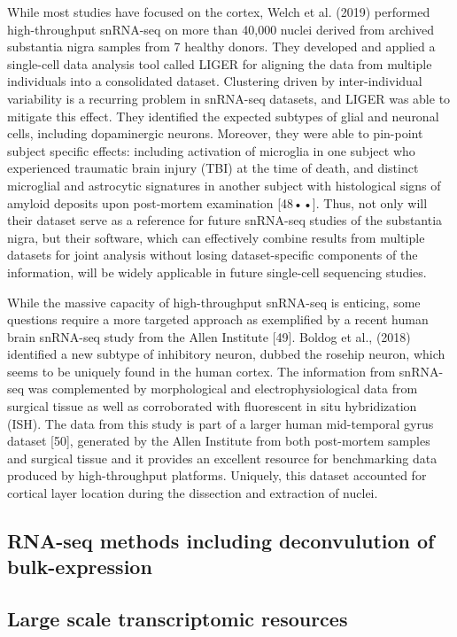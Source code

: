 \documentclass[12pt]{article}
\begin{document}
While most studies have focused on the cortex, Welch et al. (2019) performed high-throughput snRNA-seq on more than 40,000 nuclei derived from archived substantia nigra samples from 7 healthy donors. They developed and applied a single-cell data analysis tool called LIGER for aligning the data from multiple individuals into a consolidated dataset. Clustering driven by inter-individual variability is a recurring problem in snRNA-seq datasets, and LIGER was able to mitigate this effect. They identified the expected subtypes of glial and neuronal cells, including dopaminergic neurons. Moreover, they were able to pin-point subject specific effects: including activation of microglia in one subject who experienced traumatic brain injury (TBI) at the time of death, and distinct microglial and astrocytic signatures in another subject with histological signs of amyloid deposits upon post-mortem examination [48••]. Thus, not only will their dataset serve as a reference for future snRNA-seq studies of the substantia nigra, but their software, which can effectively combine results from multiple datasets for joint analysis without losing dataset-specific components of the information, will be widely applicable in future single-cell sequencing studies.

While the massive capacity of high-throughput snRNA-seq is enticing, some questions require a more targeted approach as exemplified by a recent human brain snRNA-seq study from the Allen Institute [49]. Boldog et al., (2018) identified a new subtype of inhibitory neuron, dubbed the rosehip neuron, which seems to be uniquely found in the human cortex. The information from snRNA-seq was complemented by morphological and electrophysiological data from surgical tissue as well as corroborated with fluorescent in situ hybridization (ISH). The data from this study is part of a larger human mid-temporal gyrus dataset [50], generated by the Allen Institute from both post-mortem samples and surgical tissue and it provides an excellent resource for benchmarking data produced by high-throughput platforms. Uniquely, this dataset accounted for cortical layer location during the dissection and extraction of nuclei.
 

\subsection{RNA-seq methods including deconvulution of bulk-expression}

\subsection{Large scale transcriptomic resources}
\end{document}
